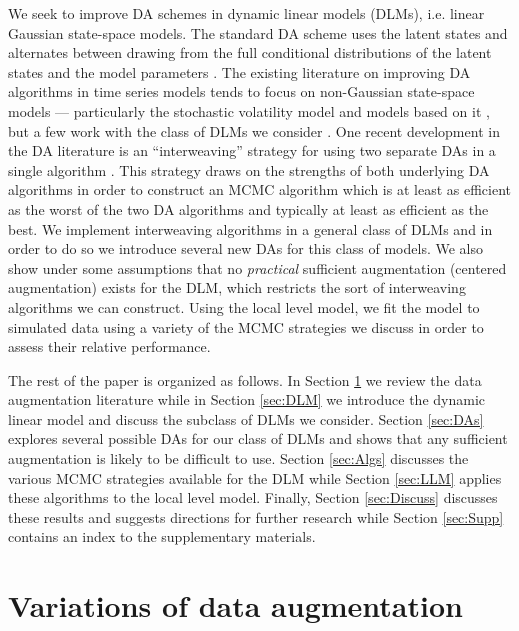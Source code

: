 \documentclass[12pt]{article}
\begin{document}
We seek to improve DA schemes in dynamic linear models (DLMs), i.e. linear Gaussian state-space models. The standard DA scheme uses the latent states and alternates between drawing from the full conditional distributions of the latent states and the model parameters \citep{fruhwirth1994data,carter1994gibbs}. The existing literature on improving DA algorithms in time series models tends to focus on non-Gaussian state-space models --- particularly the stochastic volatility model and models based on it \citep{shephard1996statistical,fruhwirth2003bayesian,roberts2004bayesian,bos2006inference,strickland2008parameterisation,fruhwirth2008heston,kastner2013ancillarity}, but a few work with the class of DLMs we consider \citep{fruhwirth2004efficient}. One recent development in the DA literature is an ``interweaving'' strategy for using two separate DAs in a single algorithm \citep{yu2011center}. This strategy draws on the strengths of both underlying DA algorithms in order to construct an MCMC algorithm which is at least as efficient as the worst of the two DA algorithms and typically at least as efficient as the best. We implement interweaving algorithms in a general class of DLMs and in order to do so we introduce several new DAs for this class of models. We also show under some assumptions that no {\it practical} sufficient augmentation (centered augmentation) exists for the DLM, which restricts the sort of interweaving algorithms we can construct. Using the local level model, we fit the model to simulated data using a variety of the MCMC strategies we discuss in order to assess their relative performance.

The rest of the paper is organized as follows. In Section \ref{sec:DA} we review the data augmentation literature while in Section \ref{sec:DLM} we introduce the dynamic linear model and discuss the subclass of DLMs we consider. Section \ref{sec:DAs} explores several possible DAs for our class of DLMs and shows that any sufficient augmentation is likely to be difficult to use. Section \ref{sec:Algs} discusses the various MCMC strategies available for the DLM while Section \ref{sec:LLM} applies these algorithms to the local level model. Finally, Section \ref{sec:Discuss} discusses these results and suggests directions for further research while Section \ref{sec:Supp} contains an index to the supplementary materials.

\section{Variations of data augmentation}\label{sec:DA}
\end{document}
